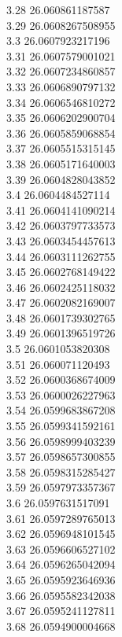 {3.28	26.060861187587\\
3.29	26.0608267508955\\
3.3	26.0607923217196\\
3.31	26.0607579001021\\
3.32	26.0607234860857\\
3.33	26.0606890797132\\
3.34	26.0606546810272\\
3.35	26.0606202900704\\
3.36	26.0605859068854\\
3.37	26.0605515315145\\
3.38	26.0605171640003\\
3.39	26.0604828043852\\
3.4	26.0604484527114\\
3.41	26.0604141090214\\
3.42	26.0603797733573\\
3.43	26.0603454457613\\
3.44	26.0603111262755\\
3.45	26.0602768149422\\
3.46	26.0602425118032\\
3.47	26.0602082169007\\
3.48	26.0601739302765\\
3.49	26.0601396519726\\
3.5	26.0601053820308\\
3.51	26.060071120493\\
3.52	26.0600368674009\\
3.53	26.0600026227963\\
3.54	26.0599683867208\\
3.55	26.0599341592161\\
3.56	26.0598999403239\\
3.57	26.0598657300855\\
3.58	26.0598315285427\\
3.59	26.0597973357367\\
3.6	26.0597631517091\\
3.61	26.0597289765013\\
3.62	26.0596948101545\\
3.63	26.0596606527102\\
3.64	26.0596265042094\\
3.65	26.0595923646936\\
3.66	26.0595582342038\\
3.67	26.0595241127811\\
3.68	26.0594900004668\\
}

